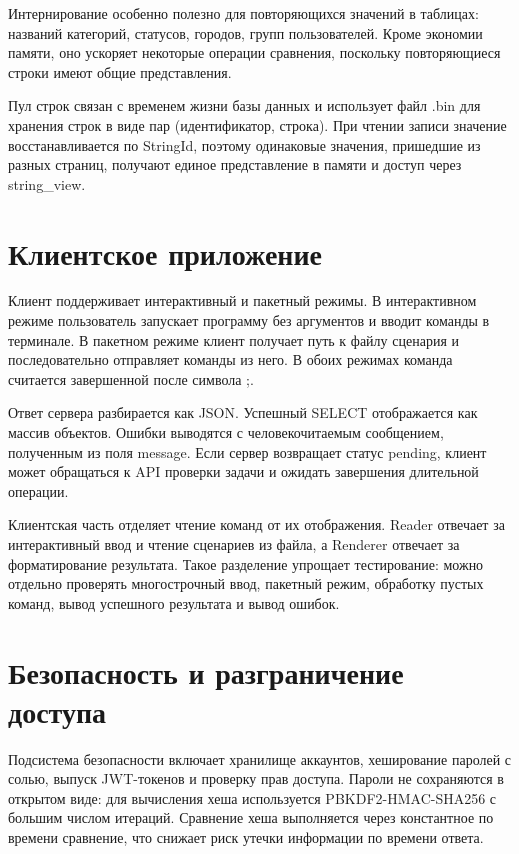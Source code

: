 \documentclass[a4paper,14pt]{extarticle}
\renewcommand{\texttt}[1]{\textrm{#1}}
\begin{document}
Интернирование особенно полезно для повторяющихся значений в таблицах: названий категорий, статусов, городов, групп пользователей. Кроме экономии памяти, оно ускоряет некоторые операции сравнения, поскольку повторяющиеся строки имеют общие представления.

Пул строк связан с временем жизни базы данных и использует файл \texttt{.bin} для хранения строк в виде пар (идентификатор, строка). При чтении записи значение восстанавливается по \texttt{StringId}, поэтому одинаковые значения, пришедшие из разных страниц, получают единое представление в памяти и доступ через \texttt{string\_view}.

\section{Клиентское приложение}

Клиент поддерживает интерактивный и пакетный режимы. В интерактивном режиме пользователь запускает программу без аргументов и вводит команды в терминале. В пакетном режиме клиент получает путь к файлу сценария и последовательно отправляет команды из него. В обоих режимах команда считается завершенной после символа \texttt{;}.

Ответ сервера разбирается как JSON. Успешный \texttt{SELECT} отображается как массив объектов. Ошибки выводятся с человекочитаемым сообщением, полученным из поля \texttt{message}. Если сервер возвращает статус \texttt{pending}, клиент может обращаться к API проверки задачи и ожидать завершения длительной операции.

Клиентская часть отделяет чтение команд от их отображения. Reader отвечает за интерактивный ввод и чтение сценариев из файла, а Renderer отвечает за форматирование результата. Такое разделение упрощает тестирование: можно отдельно проверять многострочный ввод, пакетный режим, обработку пустых команд, вывод успешного результата и вывод ошибок.

\section{Безопасность и разграничение доступа}

Подсистема безопасности включает хранилище аккаунтов, хеширование паролей с солью, выпуск JWT-токенов и проверку прав доступа. Пароли не сохраняются в открытом виде: для вычисления хеша используется PBKDF2-HMAC-SHA256 с большим числом итераций. Сравнение хеша выполняется через константное по времени сравнение, что снижает риск утечки информации по времени ответа.
\end{document}
